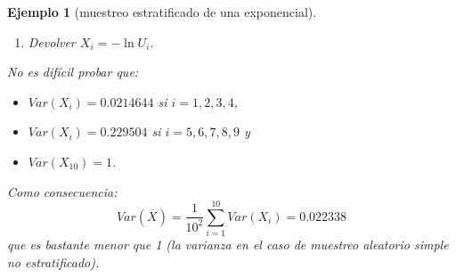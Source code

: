 \documentclass[
  10pt,
]{book}
\theoremstyle{break}
\newtheorem{example}{Ejemplo}[chapter]
\theoremstyle{nonumberplain}
\begin{document}
\begin{example}[muestreo estratificado de una exponencial]
\begin{enumerate}
  2a. Generar \(U\sim \mathcal{U}\left( 0,1\right)\).

  2b. Si \(i\leq4\) hacer \(U_{i} = 0.4 \cdot U + 0.6\).

  2c. Si \(4<i\leq9\) hacer \(U_{i} = 0.5 \cdot U + 0.1\).

  2d. Si \(i=10\) hacer \(U_{i} = 0.1 \cdot U\).
\item
  Devolver \(X_{i}=-\ln U_{i}\).
\end{enumerate}

No es difícil probar que:

\begin{itemize}
\item
  \(Var\left( X_{i}\right) = 0.0214644\) si \(i=1,2,3,4\),
\item
  \(Var\left( X_{i}\right) = 0.229504\) si \(i=5,6,7,8,9\) y
\item
  \(Var\left( X_{10}\right) = 1\).
\end{itemize}

Como consecuencia:
\[Var\left(  \overline{X}\right)  =\frac{1}{10^{2}}\sum_{i=1}^{10}
Var\left( X_{i} \right)  = 0.022338\]
que es bastante menor que 1 (la varianza en el caso de muestreo aleatorio simple no estratificado).
\end{example}
\end{document}
